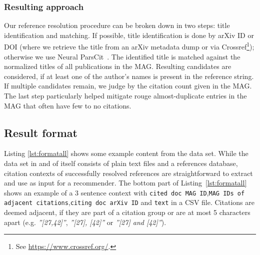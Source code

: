 \subsubsection{Resulting approach}
Our reference resolution procedure can be broken down in two steps: title identification and matching. If possible, title identification is done by arXiv ID or DOI (where we retrieve the title from an arXiv metadata dump or via Crossref\footnote{See \url{https://www.crossref.org/}.}); otherwise we use Neural ParsCit~\cite{Animesh2018}. The identified title is matched against the normalized titles of all publications in the MAG. Resulting candidates are considered, if at least one of the author's names is present in the reference string. If multiple candidates remain, we judge by the citation count given in the MAG. The last step particularly helped mitigate rouge almost-duplicate entries in the MAG that often have few to no citations.

\subsection{Result format}\label{sec:datasetformat}
Listing \ref{lst:formatall} shows some example content from the data set. While the data set in and of itself consists of plain text files and a references database, citation contexts of successfully resolved references are straightforward to extract and use as input for a recommender. The bottom part of Listing~\ref{lst:formatall} shows an example of a 3 sentence context with \texttt{cited doc MAG ID},\hphantom{n}\texttt{MAG IDs of adjacent citations},\hphantom{n}\texttt{citing doc arXiv ID} and \texttt{text} in a CSV file. Citations are deemed adjacent, if they are part of a citation group or are at most 5 characters apart (e.g. \emph{''[27,42]''}, \emph{''[27], [42]''} or \emph{''[27] and [42]''}). %

